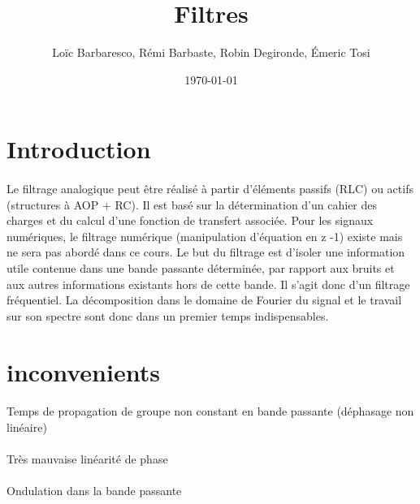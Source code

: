 \documentclass[a4paper,11pt]{article}
\title{Filtres}
\author{Loïc Barbaresco, Rémi Barbaste, Robin Degironde, Émeric Tosi}
\date{\today}
\begin{document}
    \maketitle{}

    \setcounter{tocdepth}{1} %
    \renewcommand{\contentsname}{Sommaire} %
    \tableofcontents{} %
    \clearpage



\section{Introduction}
        \paragraph{}
Le filtrage analogique peut être réalisé à partir d’éléments passifs (RLC) ou actifs (structures à AOP + RC).
Il est basé sur la détermination d’un cahier des charges et du calcul d’une fonction de transfert associée.
Pour les signaux numériques, le filtrage numérique (manipulation d’équation en z -1) existe mais ne sera pas abordé dans ce cours.
Le but du filtrage est d’isoler une information utile contenue dans une bande passante déterminée, par rapport aux bruits et aux autres informations existants hors de cette bande.
Il s’agit donc d’un filtrage fréquentiel.
La décomposition dans le domaine de Fourier du signal et le travail sur son spectre sont donc dans un premier temps indispensables.

\section{inconvenients}
    \paragraph{}
Temps de propagation de groupe non constant en bande passante (déphasage non linéaire)
    \paragraph{}
Très mauvaise linéarité de phase
    \paragraph{}
Ondulation dans la bande passante
\end{document}
